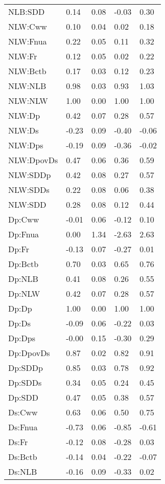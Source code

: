 \begin{center}
\begin{longtable}{|p{0.9in}|p{0.7in}|p{0.7in}|p{0.7in}|p{0.7in}|}
  NLB:SDD & 0.14 & 0.08 & -0.03 & 0.30 \\ 
  NLW:Cww & 0.10 & 0.04 & 0.02 & 0.18 \\ 
  NLW:Fnua & 0.22 & 0.05 & 0.11 & 0.32 \\ 
  NLW:Fr & 0.12 & 0.05 & 0.02 & 0.22 \\ 
  NLW:Bctb & 0.17 & 0.03 & 0.12 & 0.23 \\ 
  NLW:NLB & 0.98 & 0.03 & 0.93 & 1.03 \\ 
  NLW:NLW & 1.00 & 0.00 & 1.00 & 1.00 \\ 
  NLW:Dp & 0.42 & 0.07 & 0.28 & 0.57 \\ 
  NLW:Ds & -0.23 & 0.09 & -0.40 & -0.06 \\ 
  NLW:Dps & -0.19 & 0.09 & -0.36 & -0.02 \\ 
  NLW:DpovDs & 0.47 & 0.06 & 0.36 & 0.59 \\ 
  NLW:SDDp & 0.42 & 0.08 & 0.27 & 0.57 \\ 
  NLW:SDDs & 0.22 & 0.08 & 0.06 & 0.38 \\ 
  NLW:SDD & 0.28 & 0.08 & 0.12 & 0.44 \\ 
  Dp:Cww & -0.01 & 0.06 & -0.12 & 0.10 \\ 
  Dp:Fnua & 0.00 & 1.34 & -2.63 & 2.63 \\ 
  Dp:Fr & -0.13 & 0.07 & -0.27 & 0.01 \\ 
  Dp:Bctb & 0.70 & 0.03 & 0.65 & 0.76 \\ 
  Dp:NLB & 0.41 & 0.08 & 0.26 & 0.55 \\ 
  Dp:NLW & 0.42 & 0.07 & 0.28 & 0.57 \\ 
  Dp:Dp & 1.00 & 0.00 & 1.00 & 1.00 \\ 
  Dp:Ds & -0.09 & 0.06 & -0.22 & 0.03 \\ 
  Dp:Dps & -0.00 & 0.15 & -0.30 & 0.29 \\ 
  Dp:DpovDs & 0.87 & 0.02 & 0.82 & 0.91 \\ 
  Dp:SDDp & 0.85 & 0.03 & 0.78 & 0.92 \\ 
  Dp:SDDs & 0.34 & 0.05 & 0.24 & 0.45 \\ 
  Dp:SDD & 0.47 & 0.05 & 0.38 & 0.57 \\ 
  Ds:Cww & 0.63 & 0.06 & 0.50 & 0.75 \\ 
  Ds:Fnua & -0.73 & 0.06 & -0.85 & -0.61 \\ 
  Ds:Fr & -0.12 & 0.08 & -0.28 & 0.03 \\ 
  Ds:Bctb & -0.14 & 0.04 & -0.22 & -0.07 \\ 
  Ds:NLB & -0.16 & 0.09 & -0.33 & 0.02 \\ 

\end{longtable}
\end{center}
